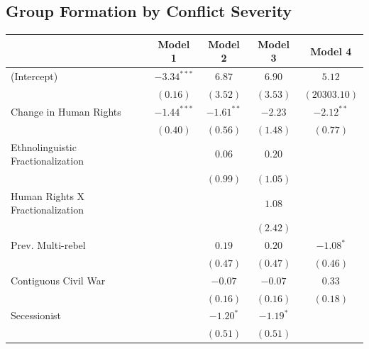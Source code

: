 \documentclass[12pt,]{book}
\let\origtable\table
\let\endorigtable\endtable
\renewenvironment{table}[1][2] {
    \singlespacing
    \expandafter\origtable\expandafter[H]
} {
    \endorigtable
}
\theoremstyle{definition}
\theoremstyle{definition}
\theoremstyle{definition}
\theoremstyle{remark}
\begin{document}
\hypertarget{group-formation-by-conflict-severity}{%
\subsection*{Group Formation by Conflict
Severity}\label{group-formation-by-conflict-severity}}

\pagebreak

\begin{table}
\begin{center}
\begin{tabular}{l c c c c }
\hline
 & Model 1 & Model 2 & Model 3 & Model 4 \\
\hline
(Intercept)                       & $-3.34^{***}$ & $6.87$       & $6.90$      & $5.12$       \\
                                  & $(0.16)$      & $(3.52)$     & $(3.53)$    & $(20303.10)$ \\
Change in Human Rights            & $-1.44^{***}$ & $-1.61^{**}$ & $-2.23$     & $-2.12^{**}$ \\
                                  & $(0.40)$      & $(0.56)$     & $(1.48)$    & $(0.77)$     \\
Ethnolinguistic Fractionalization &               & $0.06$       & $0.20$      &              \\
                                  &               & $(0.99)$     & $(1.05)$    &              \\
Human Rights X Fractionalization  &               &              & $1.08$      &              \\
                                  &               &              & $(2.42)$    &              \\
Prev. Multi-rebel                 &               & $0.19$       & $0.20$      & $-1.08^{*}$  \\
                                  &               & $(0.47)$     & $(0.47)$    & $(0.46)$     \\
Contiguous Civil War              &               & $-0.07$      & $-0.07$     & $0.33$       \\
                                  &               & $(0.16)$     & $(0.16)$    & $(0.18)$     \\
Secessionist                      &               & $-1.20^{*}$  & $-1.19^{*}$ &              \\
                                  &               & $(0.51)$     & $(0.51)$    &              \\

\end{tabular}
\end{center}
\end{table}
\end{document}
